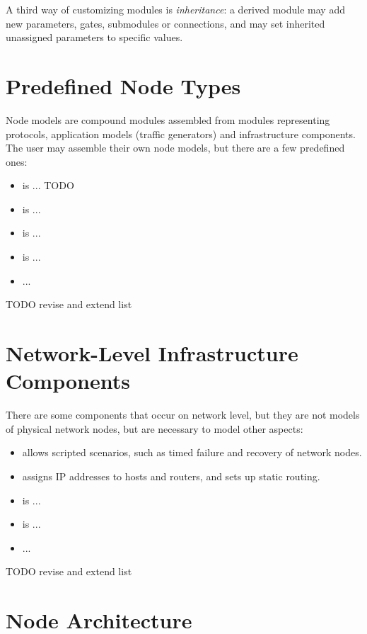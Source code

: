 A third way of customizing modules is \textit{inheritance}: a derived
module may add new parameters, gates, submodules or connections, and may
set inherited unassigned parameters to specific values.


\section{Predefined Node Types}

Node models are compound modules assembled from modules representing
protocols, application models (traffic generators) and infrastructure
components. The user may assemble their own node models, but there
are a few predefined ones:

\begin{itemize}
\item {} is ... TODO
\item {} is ...
\item {} is ...
\item {} is ...
\item ...
\end{itemize}

TODO revise and extend list

\section{Network-Level Infrastructure Components}

There are some components that occur on network level, but they
are not models of physical network nodes, but are necessary 
to model other aspects:

\begin{itemize}
  \item {} allows scripted scenarios, such
     as timed failure and recovery of network nodes.
  \item {} assigns IP addresses 
     to hosts and routers, and sets up static routing.
\item {} is ...
\item {} is ...
\item ...
\end{itemize}

TODO revise and extend list

\section{Node Architecture}


